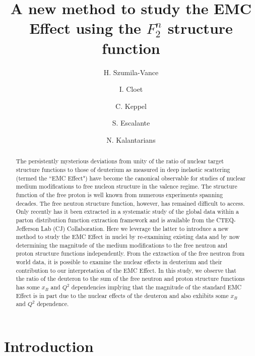 \documentclass[oneside]{article}
\title{\vspace{-15mm}\fontsize{20pt}{10pt}\selectfont\textbf{A new method to study the EMC Effect using the $F_2^{n}$ structure function}} %
\author[1]{H. Szumila-Vance}
\author[2]{I. Cloet}
\author[1]{C. Keppel}
\author[3]{S. Escalante}
\author[3]{N. Kalantarians}
\affil[1]{Thomas Jefferson National Accelerator Facility, Newport News, VA}
\affil[2]{Argonne National Laboratory, Argonne, IL}
\affil[3]{Virginia Union University, Richmond, VA}
\date{}
\begin{document}
\maketitle %

\thispagestyle{fancy} %


\begin{abstract}
The persistently mysterious deviations from unity of the ratio of nuclear target structure functions to those of deuterium as measured in deep inelastic scattering (termed the ``EMC Effect") have become the canonical observable for studies of nuclear medium modifications to free nucleon structure in the valence regime. The structure function of the free proton is well known from numerous experiments spanning decades. The free neutron structure function, however, has remained difficult to access. Only recently has it been extracted in a systematic study of the global data within a parton distribution function extraction framework and is available from the CTEQ-Jefferson Lab (CJ) Collaboration. Here we leverage the latter to introduce a new method to study the EMC Effect in nuclei by re-examining existing data and by now determining the magnitude of the medium modifications to the free neutron and proton structure functions independently. From the extraction of the free neutron from world data, it is possible to examine the nuclear effects in deuterium and their contribution to our interpretation of the EMC Effect. In this study, we observe that the ratio of the deuteron to the sum of the free neutron and proton structure functions has some $x_{B}$ and $Q^{2}$ dependencies implying that the magnitude of the standard EMC Effect is in part due to the nuclear effects of the deuteron and also exhibits some $x_{B}$ and $Q^{2}$ dependence.
\end{abstract}


\section{Introduction}
 
\end{document}
